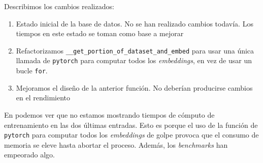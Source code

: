\begin{table}[H]
    \centering
    \caption{Tabla que recoge el segundo proceso de optimización del código. Identificamos numéricamente los cambios realizados, que a continuación describiremos. Por cada cambio, vemos los nuevos resultados en los \textit{benchmarks}. También vemos el tiempo que tarda en completarse el ciclo de entrenamiento. Los tiempos de los \textit{benchmarks} se dan como un par (media, desviación típica). Damos los tiempos en segundos}
    \label{table:optimization_process_second}
\end{table}

Describimos los cambios realizados:

\begin{enumerate}
    \item Estado inicial de la base de datos. No se han realizado cambios todavía. Los tiempos en este estado se toman como base a mejorar
    \item Refactorizamos \lstinline{__get_portion_of_dataset_and_embed} para usar una única llamada de \lstinline{pytorch} para computar todos los \textit{embeddings}, en vez de usar un bucle \lstinline{for}.
    \item Mejoramos el diseño de la anterior función. No deberían producirse cambios en el rendimiento
\end{enumerate}

En  podemos ver que no estamos mostrando tiempos de cómputo de entrenamiento en las dos últimas entradas. Esto es porque el uso de la función de \lstinline{pytorch} para computar todos los \textit{embeddings} de golpe provoca que el consumo de memoria se eleve hasta abortar el proceso. Además, los \textit{benchmarks} han empeorado algo.

